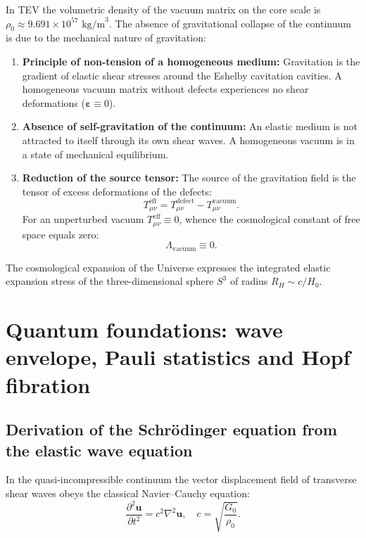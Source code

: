 \documentclass[11pt,a4paper]{article}
\theoremstyle{definition}
\theoremstyle{remark}
\begin{document}
In TEV the volumetric density of the vacuum matrix on the core scale is $\rho_0 \approx 9.691 \times 10^{57}\text{ kg/m}^3$. The absence of gravitational collapse of the continuum is due to the mechanical nature of gravitation:
\begin{enumerate}
	\item \textbf{Principle of non-tension of a homogeneous medium:} Gravitation is the gradient of elastic shear stresses around the Eshelby cavitation cavities. A homogeneous vacuum matrix without defects experiences no shear deformations ($\boldsymbol{\varepsilon} \equiv 0$).
	\item \textbf{Absence of self-gravitation of the continuum:} An elastic medium is not attracted to itself through its own shear waves. A homogeneous vacuum is in a state of mechanical equilibrium.
	\item \textbf{Reduction of the source tensor:} The source of the gravitation field is the tensor of excess deformations of the defects:
\begin{equation}
	T_{\mu\nu}^{\mathrm{eff}} = T_{\mu\nu}^{\mathrm{defect}} - T_{\mu\nu}^{\mathrm{vacuum}}.
	\label{eq:effective_stress_tensor}
\end{equation}
For an unperturbed vacuum $T_{\mu\nu}^{\mathrm{eff}} \equiv 0$, whence the cosmological constant of free space equals zero:
\begin{equation}
	\Lambda_{\mathrm{vacuum}} \equiv 0.
	\label{eq:lambda_vacuum_zero}
\end{equation}
\end{enumerate}
The cosmological expansion of the Universe expresses the integrated elastic expansion stress of the three-dimensional sphere $S^3$ of radius $R_H \sim c / H_0$.

\section{Quantum foundations: wave envelope, Pauli statistics and Hopf fibration}

\subsection{Derivation of the Schrödinger equation from the elastic wave equation}

In the quasi-incompressible continuum the vector displacement field of transverse shear waves obeys the classical Navier--Cauchy equation:
\begin{equation}
	\frac{\partial^2 \mathbf{u}}{\partial t^2} = c^2 \nabla^2 \mathbf{u}, \quad c = \sqrt{\frac{G_0}{\rho_0}}.
	\label{eq:navier_cauchy_scalar}
\end{equation}
\end{document}
